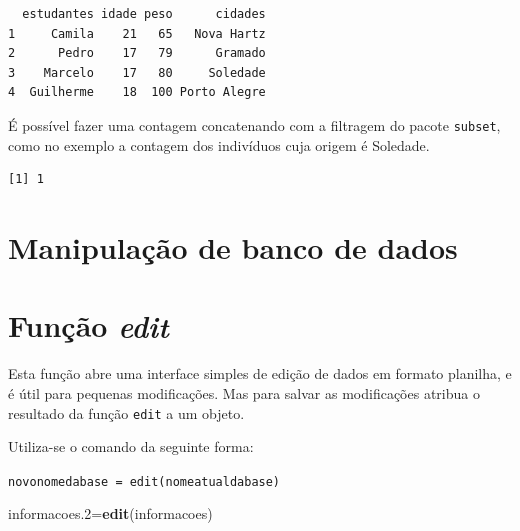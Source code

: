 \documentclass[12pt,brazil,]{book}
\newenvironment{Shaded}{\begin{snugshade}}{\end{snugshade}}
\newcommand{\FloatTok}[1]{\textcolor[rgb]{0.00,0.00,0.81}{#1}}
\newcommand{\KeywordTok}[1]{\textcolor[rgb]{0.13,0.29,0.53}{\textbf{#1}}}
\newcommand{\NormalTok}[1]{#1}
\newcommand{\OperatorTok}[1]{\textcolor[rgb]{0.81,0.36,0.00}{\textbf{#1}}}
\newcommand{\StringTok}[1]{\textcolor[rgb]{0.31,0.60,0.02}{#1}}
\begin{document}
\begin{verbatim}
  estudantes idade peso      cidades
1     Camila    21   65   Nova Hartz
2      Pedro    17   79      Gramado
3    Marcelo    17   80     Soledade
4  Guilherme    18  100 Porto Alegre
\end{verbatim}

É possível fazer uma contagem concatenando com a filtragem do pacote
\texttt{subset}, como no exemplo a contagem dos indivíduos cuja origem é
Soledade.

\begin{Shaded}
\end{Shaded}

\begin{verbatim}
[1] 1
\end{verbatim}

\hypertarget{manipulacao-de-banco-de-dados}{%
\section{Manipulação de banco de
dados}\label{manipulacao-de-banco-de-dados}}

\hypertarget{funcao-edit}{%
\section{\texorpdfstring{Função
\emph{edit}}{Função edit}}\label{funcao-edit}}

Esta função abre uma interface simples de edição de dados em formato
planilha, e é útil para pequenas modificações. Mas para salvar as
modificações atribua o resultado da função \texttt{edit} a um objeto.

Utiliza-se o comando da seguinte forma:

\texttt{novonomedabase\ =\ edit(nomeatualdabase)}

\begin{Shaded}
\begin{Highlighting}[]
\NormalTok{informacoes}\FloatTok{.2}\NormalTok{=}\KeywordTok{edit}\NormalTok{(informacoes)}
\end{Highlighting}
\end{Shaded}
\end{document}
